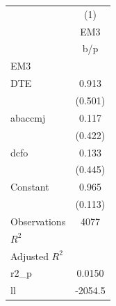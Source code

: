 {
\def\sym#1{\ifmmode^{#1}\else\(^{#1}\)\fi}
\begin{tabular}{l*{1}{c}}
\hline\hline
                    &\multicolumn{1}{c}{(1)}\\
                    &\multicolumn{1}{c}{EM3}\\
                    &         b/p   \\
\hline
EM3                 &               \\
DTE                 &       0.913   \\
                    &     (0.501)   \\
abaccmj             &       0.117   \\
                    &     (0.422)   \\
dcfo                &       0.133   \\
                    &     (0.445)   \\
Constant            &       0.965   \\
                    &     (0.113)   \\
\hline
Observations        &        4077   \\
\(R^{2}\)           &               \\
Adjusted \(R^{2}\)  &               \\
r2\_p                &      0.0150   \\
ll                  &     -2054.5   \\
\hline\hline
\end{tabular}
}
